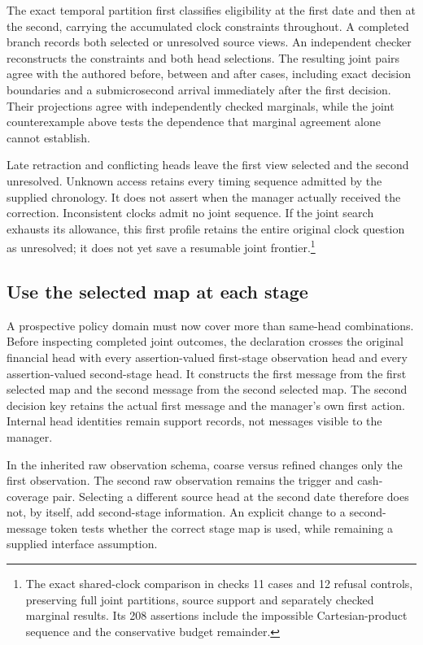 The exact temporal partition first classifies eligibility at the first date and then at the second, carrying the accumulated clock constraints throughout. A completed branch records both selected or unresolved source views. An independent checker reconstructs the constraints and both head selections. The resulting joint pairs agree with the authored before, between and after cases, including exact decision boundaries and a submicrosecond arrival immediately after the first decision. Their projections agree with independently checked marginals, while the joint counterexample above tests the dependence that marginal agreement alone cannot establish.

Late retraction and conflicting heads leave the first view selected and the second unresolved. Unknown access retains every timing sequence admitted by the supplied chronology. It does not assert when the manager actually received the correction. Inconsistent clocks admit no joint sequence. If the joint search exhausts its allowance, this first profile retains the entire original clock question as unresolved; it does not yet save a resumable joint frontier.\footnote{The exact shared-clock comparison in  checks 11 cases and 12 refusal controls, preserving full joint partitions, source support and separately checked marginal results. Its 208 assertions include the impossible Cartesian-product sequence and the conservative budget remainder.}

\subsection{Use the selected map at each stage}

A prospective policy domain must now cover more than same-head combinations. Before inspecting completed joint outcomes, the declaration crosses the original financial head with every assertion-valued first-stage observation head and every assertion-valued second-stage head. It constructs the first message from the first selected map and the second message from the second selected map. The second decision key retains the actual first message and the manager's own first action. Internal head identities remain support records, not messages visible to the manager.

In the inherited raw observation schema, coarse versus refined changes only the first observation. The second raw observation remains the trigger and cash-coverage pair. Selecting a different source head at the second date therefore does not, by itself, add second-stage information. An explicit change to a second-message token tests whether the correct stage map is used, while remaining a supplied interface assumption.

